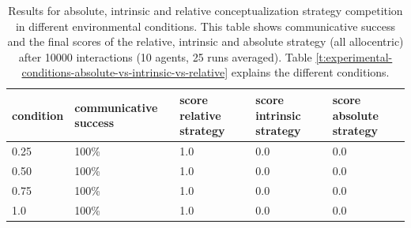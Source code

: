 \begin{table}
\caption[Results absolute, intrinsic and relative 
strategy competition]{
Results for absolute, intrinsic and relative 
conceptualization strategy competition
in different environmental conditions. This table shows 
communicative success and the
final scores of the relative, intrinsic and absolute 
strategy (all allocentric) after 10000 interactions 
(10 agents, 25 runs averaged).
Table \ref{t:experimental-conditions-absolute-vs-intrinsic-vs-relative} explains 
the different conditions.}
\begin{center}
\begin{tabular}{| p{1.5cm} | p{2.5cm} | p{1.5cm} | p{1.5cm}  | p{1.5cm} |}
\hline
condition & communicative success & score relative strategy 
& score intrinsic strategy & score absolute strategy\\ \hline\hline
0.25 & 100\% & 1.0 & 0.0 &  0.0\\ \hline
0.50 & 100\% & 1.0 & 0.0 &  0.0\\ \hline
0.75 & 100\% & 1.0 & 0.0 &  0.0\\ \hline
1.0 & 100\% & 1.0 & 0.0 &  0.0\\ \hline
\end{tabular}
\end{center}
\label{t:absolute-vs-intrinsic-vs-relative}
\end{table}

